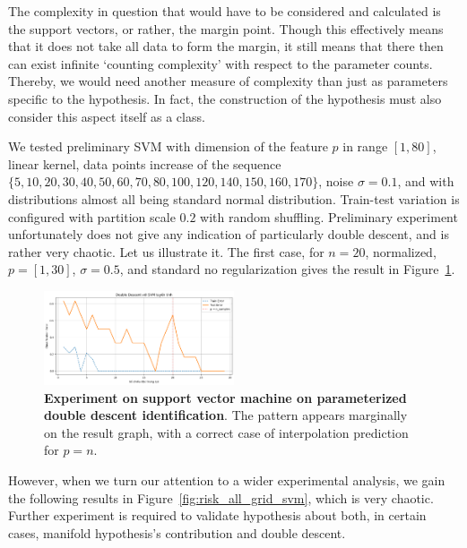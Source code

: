 \documentclass{article}
\begin{document}
The complexity in question that would have to be considered and calculated is the support vectors, or rather, the margin point. Though this effectively means that it does not take all data to form the margin, it still means that there then can exist infinite `counting complexity' with respect to the parameter counts. Thereby, we would need another measure of complexity than just as parameters specific to the hypothesis. In fact, the construction of the hypothesis must also consider this aspect itself as a class. 

We tested preliminary SVM with dimension of the feature $p$ in range $[1,80]$, linear kernel, data points increase of the sequence $\{5, 10, 20, 30, 40 , 50, 60, 70 , 80, 100, 120, 140, 150, 160, 170\}$, noise $\sigma = 0.1$, and with distributions almost all being standard normal distribution. Train-test variation is configured with partition scale $0.2$ with random shuffling. Preliminary experiment unfortunately does not give any indication of particularly double descent, and is rather very chaotic. Let us illustrate it. The first case, for $n=20$, normalized, $p=[1,30]$, $\sigma =0.5$, and standard no regularization gives the result in Figure~\ref{fig:test_svm_com_ideal}.

\begin{figure}[htb]
  \centering
  \includegraphics[width=0.5\textwidth]{test_case_ideal_svm.png}
  \caption{\textbf{Experiment on support vector machine on parameterized double descent identification}. The pattern appears marginally on the result graph, with a correct case of interpolation prediction for $p=n$.}
  \label{fig:test_svm_com_ideal}
\end{figure}
However, when we turn our attention to a wider experimental analysis, we gain the following results in Figure~\ref{fig:risk_all_grid_svm}, which is very chaotic. Further experiment is required to validate hypothesis about both, in certain cases, manifold hypothesis's contribution and double descent. 
\end{document}
